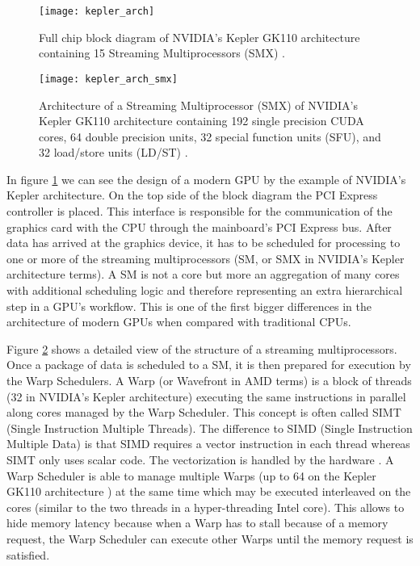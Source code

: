 \begin{figure}
\centering
\texttt{[image: kepler\_arch]}
\caption{Full chip block diagram of NVIDIA's Kepler GK110 architecture containing 15 Streaming Multiprocessors (SMX) \cite{kepler_arch}.}
\label{fig:kepler_arch}
\end{figure}

\begin{figure}
\centering
\texttt{[image: kepler\_arch\_smx]}
\caption{Architecture of a Streaming Multiprocessor (SMX) of NVIDIA's Kepler GK110 architecture containing 192 single precision CUDA cores, 64 double precision units, 32 special function units (SFU), and 32 load/store units (LD/ST) \cite{kepler_arch}.}
\label{fig:kepler_arch_smx}
\end{figure}

In figure \ref{fig:kepler_arch} we can see the design of a modern GPU by the example of NVIDIA's Kepler architecture. On the top side of the block diagram the PCI Express controller is placed. This interface is responsible for the communication of the graphics card with the CPU through the mainboard's PCI Express bus. After data has arrived at the graphics device, it has to be scheduled for processing to one or more of the streaming multiprocessors (SM, or SMX in NVIDIA's Kepler architecture terms). A SM is not a core but more an aggregation of many cores with additional scheduling logic and therefore representing an extra hierarchical step in a GPU's workflow. This is one of the first bigger differences in the architecture of modern GPUs when compared with traditional CPUs.

Figure \ref{fig:kepler_arch_smx} shows a detailed view of the structure of a streaming multiprocessors. Once a package of data is scheduled to a SM, it is then prepared for execution by the Warp Schedulers. A Warp (or Wavefront in AMD terms) is a block of threads (32 in NVIDIA's Kepler architecture) executing the same instructions in parallel along cores managed by the Warp Scheduler. This concept is often called SIMT (Single Instruction Multiple Threads). The difference to SIMD (Single Instruction Multiple Data) is that SIMD requires a vector instruction in each thread whereas SIMT only uses scalar code. The vectorization is handled by the hardware \cite[p.99]{gpu_optimizations}. A Warp Scheduler is able to manage multiple Warps (up to 64 on the Kepler GK110 architecture \cite[p.7]{kepler_arch}) at the same time which may be executed interleaved on the cores (similar to the two threads in a hyper-threading Intel core). This allows to hide memory latency because when a Warp has to stall because of a memory request, the Warp Scheduler can execute other Warps until the memory request is satisfied.

